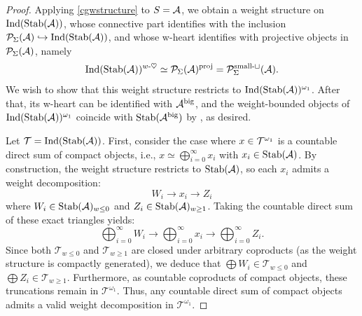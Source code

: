 \documentclass[a4paper,10pt, oneside]{amsart}
\begin{document}
\begin{proof}
	Applying \cref{cgwstructure} to $S=\mathcal{A}$, we obtain a weight structure on $\mathrm{Ind}(\mathrm{Stab}(\mathcal{A}))$, whose connective part identifies with the inclusion $\mathcal{P}_\Sigma(\mathcal{A})\hookrightarrow \mathrm{Ind}(\mathrm{Stab}(\mathcal{A}))$, and whose w-heart identifies with projective objects in $\mathcal{P}_\Sigma(\mathcal{A})$, namely $$\mathrm{Ind}(\mathrm{Stab}(\mathcal{A}))^{w\text{-}\heartsuit}\simeq\mathcal{P}_\Sigma(\mathcal{A})^{\mathrm{proj}}=\mathcal{P}_{\Sigma}^{\mathrm{small}\text{-}\sqcup}(\mathcal{A}).$$ We wish to show that this weight structure restricts to  $\mathrm{Ind}(\mathrm{Stab}(\mathcal{A}))^{\omega_1}$. After that,  its w-heart can be identified with $\mathcal{A}^{\mathrm{big}}$, and the weight-bounded objects of $\mathrm{Ind}(\mathrm{Stab}(\mathcal{A}))^{\omega_1}$ coincide with  \(\mathrm{Stab}(\mathcal{A}^{\mathrm{big}})\) by \cite[Corollary 3.4]{Sosnilo_2019}, as desired.
	
Let $\mathcal{T}=\mathrm{Ind}(\mathrm{Stab}(\mathcal{A}))$. First, consider the case where $x \in \mathcal{T}^{\omega_1}$ is a countable direct sum of compact objects, i.e., $x \simeq \bigoplus_{i=0}^\infty x_i$ with $x_i \in \mathrm{Stab}(\mathcal{A})$. By construction, the weight structure restricts to $\mathrm{Stab}(\mathcal{A})$, so each $x_i$ admits a weight decomposition:
\[
W_i \longrightarrow x_i \longrightarrow Z_i
\]
where $W_i \in \mathrm{Stab}(\mathcal{A})_{w \leq 0}$ and $Z_i \in \mathrm{Stab}(\mathcal{A})_{w \geq 1}$. Taking the countable direct sum of these exact triangles yields:
\[
\bigoplus_{i=0}^\infty W_i \longrightarrow \bigoplus_{i=0}^\infty x_i \longrightarrow \bigoplus_{i=0}^\infty Z_i.
\]
Since both $\mathcal{T}_{w \leq 0}$  and $\mathcal{T}_{w \geq 1}$ are closed under arbitrary coproducts (as the weight structure is compactly generated), we deduce that $\bigoplus W_i \in \mathcal{T}_{w \leq 0}$ and $\bigoplus Z_i \in \mathcal{T}_{w \geq 1}$. Furthermore, as countable coproducts of compact objects, these truncations remain in $\mathcal{T}^{\omega_1}$. Thus, any countable direct sum of compact objects admits a valid weight decomposition in $\mathcal{T}^{\omega_1}$.


\end{proof}
\end{document}
